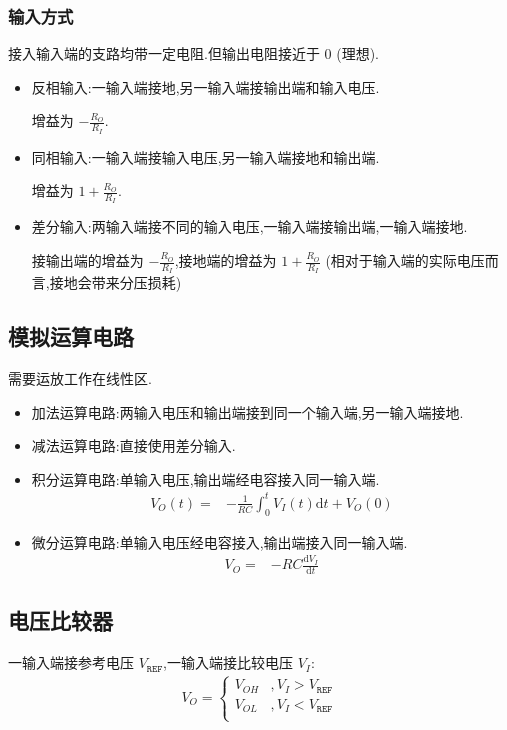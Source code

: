             \subsubsection{输入方式}
            接入输入端的支路均带一定电阻.但输出电阻接近于 0 (理想).
            \begin{itemize}
                \item 反相输入:一输入端接地,另一输入端接输出端和输入电压.

                    增益为 $-\frac{R_{O}}{R_{I}}$.
                \item 同相输入:一输入端接输入电压,另一输入端接地和输出端.

                    增益为 $1+\frac{R_{O}}{R_{I}}$.
                \item 差分输入:两输入端接不同的输入电压,一输入端接输出端,一输入端接地.

                    接输出端的增益为 $-\frac{R_{O}}{R_{I}}$,接地端的增益为 $1+\frac{R_{O}}{R_{I}}$ (相对于输入端的实际电压而言,接地会带来分压损耗)
            \end{itemize}
        \subsection{模拟运算电路}
        需要运放工作在线性区.
        \begin{itemize}
            \item 加法运算电路:两输入电压和输出端接到同一个输入端,另一输入端接地.
            \item 减法运算电路:直接使用差分输入.
            \item 积分运算电路:单输入电压,输出端经电容接入同一输入端.
                \begin{align}
                    V_{O}\left( t \right) =&-\frac{1}{RC}\int_{0}^{t}V_{I}\left( t \right) \mathrm{d}t+V_{O}\left( 0 \right) \nonumber
                \end{align}
            \item 微分运算电路:单输入电压经电容接入,输出端接入同一输入端.
                \begin{align}
                    V_{O}=&-RC \frac{\mathrm{d}V_{I}}{\mathrm{d}t}\nonumber
                \end{align}
        \end{itemize}
        \subsection{电压比较器}
        一输入端接参考电压 $V_{\texttt{REF}}$,一输入端接比较电压 $V_{I}$:
        \begin{align}
            V_{O}=\begin{cases}
                    V_{OH}&,V_{I}>V_{\texttt{REF}}\\
                    V_{OL}&,V_{I}<V_{\texttt{REF}}\\
                \end{cases}\nonumber
        \end{align}
